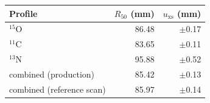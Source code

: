 \begin{tabular}{lrr}
\toprule
Profile & $R_{50}$ (mm) & $u_{\mathrm{xs}}$ (mm) \\
\midrule
$^{15}$O & 86.48 & $\pm$0.17 \\
$^{11}$C & 83.65 & $\pm$0.11 \\
$^{13}$N & 95.88 & $\pm$0.52 \\
combined (production) & 85.42 & $\pm$0.13 \\
combined (reference scan) & 85.97 & $\pm$0.14 \\
\bottomrule
\end{tabular}
